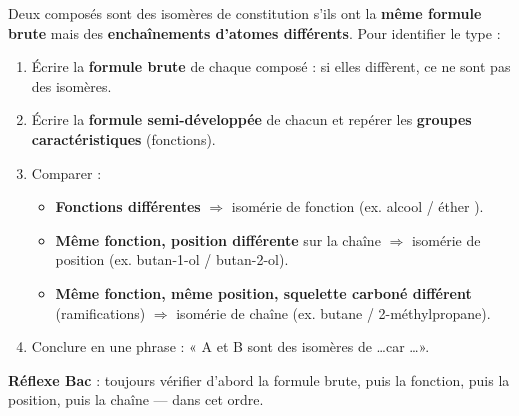 \documentclass[11pt]{article}
\newcommand{\cle}[1]{{\popxbold\color{popdark}#1}}
\begin{document}
\begin{methode}
Deux composés sont des \cle{isomères de constitution} s'ils ont la \textbf{même formule brute} mais des \textbf{enchaînements d'atomes différents}. Pour identifier le type :
\begin{enumerate}
\item Écrire la \textbf{formule brute} de chaque composé : si elles diffèrent, ce ne sont pas des isomères.
\item Écrire la \textbf{formule semi-développée} de chacun et repérer les \textbf{groupes caractéristiques} (fonctions).
\item Comparer :
\begin{itemize}
\item \textbf{Fonctions différentes} $\Rightarrow$ isomérie de \cle{fonction} (ex. alcool  / éther ).
\item \textbf{Même fonction, position différente} sur la chaîne $\Rightarrow$ isomérie de \cle{position} (ex. butan-1-ol / butan-2-ol).
\item \textbf{Même fonction, même position, squelette carboné différent} (ramifications) $\Rightarrow$ isomérie de \cle{chaîne} (ex. butane / 2-méthylpropane).
\end{itemize}
\item Conclure en une phrase : « A et B sont des isomères de \ldots car \ldots ».
\end{enumerate}
\textbf{Réflexe Bac} : toujours vérifier d'abord la formule brute, puis la fonction, puis la position, puis la chaîne — dans cet ordre.
\end{methode}
\end{document}
